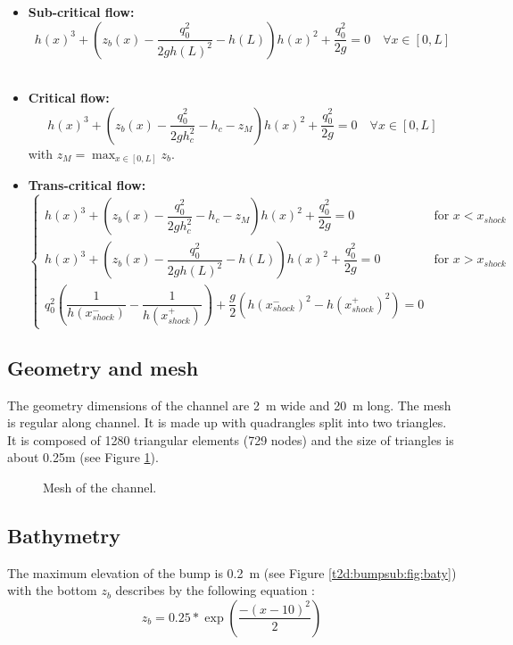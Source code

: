 \begin{itemize}
\item {\bf Sub-critical flow:}
\begin{equation}
 h(x)^3 + \left( z_b(x) - \dfrac{q_0^2}{2g h(L)^2} - h(L) \right) h(x)^2 + \dfrac{q_0^2}{2g} = 0 \quad \forall x \in [0,L]
\end{equation}
\

\item {\bf Critical flow:}
\begin{equation}
h(x)^3 + \left( z_b(x) - \dfrac{q_0^2}{2g h_c^2} - h_c - z_M \right) h(x)^2 + \dfrac{q_0^2}{2g} = 0 \quad \forall x \in [0,L]
\end{equation}
with $ z_M = \max_{x \in [0,L]}z_b$.
\

\item {\bf Trans-critical flow:}
\begin{equation}
\begin{cases}
h(x)^3 + \left( z_b(x) - \dfrac{q_0^2}{2g h_c^2} - h_c - z_M \right) h(x)^2 + \dfrac{q_0^2}{2g} = 0 \quad & \text{for  } x < x_{shock}  \\
h(x)^3 + \left( z_b(x) - \dfrac{q_0^2}{2g h(L)^2} - h(L) \right) h(x)^2 + \dfrac{q_0^2}{2g} = 0 \quad &\text{for  } x > x_{shock} \\
q_0^2 \left( \dfrac{1}{h(x_{shock}^-)} - \dfrac{1}{h(x_{shock}^+)} \right) + \dfrac{g}{2} \left( h(x_{shock}^-)^2 -h(x_{shock}^+)^2 \right) = 0
\end{cases}
\end{equation}
\end{itemize}

\subsection{Geometry and mesh}

The geometry dimensions of the channel are 2~m wide and 20~m long.
The mesh is regular along channel. It is made up with
quadrangles split into two triangles.
It is composed of 1280 triangular elements (729 nodes)
and the size of triangles is about 0.25m
(see Figure \ref{t2d:bumpsub:fig:mesh}).

\begin{figure}[!htbp]
 \centering
 \caption{Mesh of the channel.}
 \label{t2d:bumpsub:fig:mesh}
\end{figure}

\subsection{Bathymetry}
The maximum elevation of
the bump is 0.2~m (see Figure \ref{t2d:bumpsub:fig:baty}) with
the bottom $z_b$ describes by the following equation :
\begin{equation*}
z_b = 0.25 * \exp \left(\dfrac{-(x-10)^2}{2} \right)
\end{equation*}

